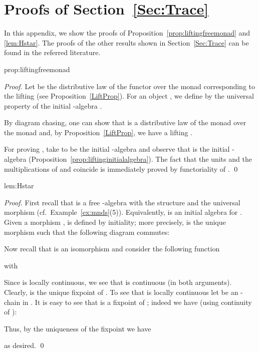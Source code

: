 \documentclass[oribibl,envcountsame,envcountsect,runningheads]{llncs}
\renewcommand{\>}{\rangle}
\newenvironment{proposition_for}[2][\empty]{\bigskip\noindent{\bf
    Proposition~\ref{#2}}\ifthenelse{\equal{#1}{\empty}}{{\bf.}}{ {\bf
      (#1).}}\it}{\vspace{0.5cm}}
\begin{document}
\newpage
\appendix
\appendix



\section{Proofs of Section~\ref{Sec:Trace}}
In this appendix, we show the proofs of Proposition~\ref{prop:liftingfreemonad} and \ref{lem:Hstar}.
The proofs of the other results shown in Section~\ref{Sec:Trace} can be found in the referred literature.

\begin{proposition_for}{prop:liftingfreemonad}
\propliftingfreemonad
\end{proposition_for}
\begin{proof}

Let  be the distributive law of the functor  over the monad  corresponding to the lifting  (see Proposition~\ref{LiftProp}).
For an object , we define  by the universal property of the initial -algebra .

By diagram chasing, one can show that  is a distributive law of the monad 
over the monad  and, by Proposition~\ref{LiftProp}, we have a lifting .

For proving ,
take  to be the initial -algebra and observe that  is the initial
-algebra (Proposition~\ref{prop:liftinginitialalgebra}). The fact that the units and the multiplications of  and  coincide is immediately proved by functoriality of .
\qed
\end{proof}




\begin{proposition_for}{lem:Hstar}
 \lemHstar
\end{proposition_for}
\begin{proof}
  First recall that  is a free -algebra with the
  structure  and the universal morphism 
  (cf.~Example~\ref{ex:mnds}(5)). Equivalently,  is an initial algebra for
  . Given a morphism ,  is defined by
  initiality; more precisely,  is the unique morphism such
  that the following diagram commutes:
  
  Now recall that  is an isomorphism and consider the following function
  
  with
  
  Since  is locally continuous, we see that  is continuous (in
  both arguments). Clearly,  is the unique fixpoint of . To see that  is
  locally continuous let  be an -chain in . It is easy to see that 
  is a fixpoint of ; indeed we
  have (using continuity of ):
  
  Thus, by the uniqueness of the fixpoint  we have
  
  as desired. \qed
\end{proof}
\end{document}
